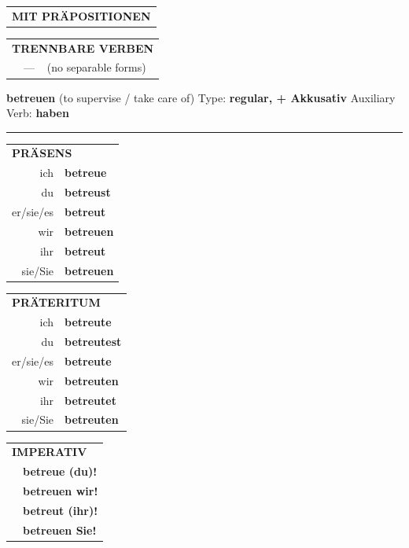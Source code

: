 \documentclass[10pt,a4paper]{revtex4-2}
\begin{document}
\begin{verbbox-acc}
\vspace{10pt}

\begin{tabular}{lll}
\multicolumn{3}{l}{\textbf{MIT PRÄPOSITIONEN}}\\
\end{tabular}
\hfill
\begin{tabular}{lll}
\multicolumn{3}{l}{\textbf{TRENNBARE VERBEN}}\\
& --- & (no separable forms)\\
\end{tabular}
\vspace{-5pt}
\end{verbbox-acc}

\begin{verbbox-acc}
{\Large \bf betreuen} (to supervise / take care of) \hfill Type: \textbf{regular, + Akkusativ} \hfill Auxiliary Verb: \textbf{haben}

\vspace{5pt}
\hrule
\vspace{5pt}

\begin{tabular}{rl}
\multicolumn{2}{l}{\textbf{PRÄSENS}}\\
ich & \textbf{betreue}\\
du & \textbf{betreust}\\
er/sie/es & \textbf{betreut}\\
wir & \textbf{betreuen}\\
ihr & \textbf{betreut}\\
sie/Sie & \textbf{betreuen}\\
\end{tabular}
\hfill
\begin{tabular}{rl}
\multicolumn{2}{l}{\textbf{PRÄTERITUM}}\\
ich & \textbf{betreute}\\
du & \textbf{betreutest}\\
er/sie/es & \textbf{betreute}\\
wir & \textbf{betreuten}\\
ihr & \textbf{betreutet}\\
sie/Sie & \textbf{betreuten}\\
\end{tabular}
\hfill
\begin{tabular}{rl}
\multicolumn{2}{l}{\textbf{IMPERATIV}}\\
& \textbf{betreue (du)!}\\
& \textbf{betreuen wir!}\\
& \textbf{betreut (ihr)!}\\
& \textbf{betreuen Sie!}\\
\end{tabular}


\end{verbbox-acc}
\end{document}
